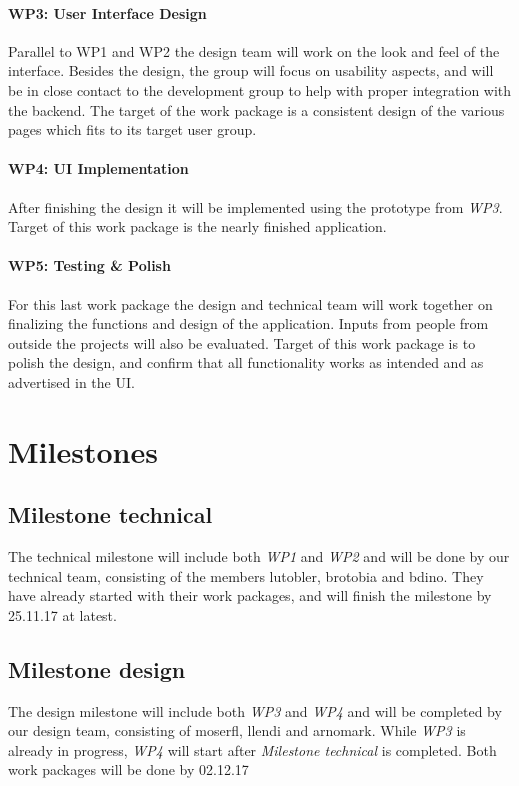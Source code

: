 \documentclass{report}
\begin{document}
\paragraph{WP3: User Interface Design}
Parallel to WP1 and WP2 the design team will work on the look and feel of the interface. 
Besides the design, the group will focus on usability aspects, and will be in close
contact to the development group to help with proper integration with the backend. 
The target of the work package is a consistent design of the various pages which 
fits to its target user group.

\paragraph{WP4: UI Implementation}
After finishing the design it will be implemented using the prototype from \emph{WP3}.
Target of this work package is the nearly finished application.

\paragraph{WP5: Testing \& Polish}
For this last work package the design and technical team will work together
on finalizing the functions and design of the application. Inputs from people from outside 
the projects will also be evaluated. Target of this work package is to polish the design,
and confirm that all functionality works as intended and as advertised in the UI.
\newpage
\section{Milestones}

\subsection{Milestone technical}
The technical milestone will include both \emph{WP1} and \emph{WP2} and will be done by our technical team,
consisting of the members lutobler, brotobia and bdino.
They have already started with their work packages, and will finish the milestone by 25.11.17 at latest.

\subsection{Milestone design}
The design milestone will include both \emph{WP3} and \emph{WP4} and will be completed by our design team, 
consisting of moserfl, llendi and arnomark. While \emph{WP3} is already in progress, \emph{WP4} will start
after \emph{Milestone technical} is completed. Both work packages will be done by 02.12.17
\end{document}
